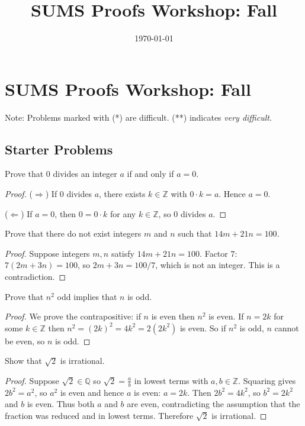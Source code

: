 \documentclass[12pt]{article}
\title{SUMS Proofs Workshop: Fall}
\author{}
\date{\today}
\begin{document}
\section*{SUMS Proofs Workshop: Fall}

Note: Problems marked with (*) are difficult. (**) indicates \emph{very difficult}.

\subsection*{Starter Problems}

\begin{problem}
Prove that $0$ divides an integer $a$ if and only if $a=0$.

\begin{proof}
($\Rightarrow$) If $0$ divides $a$, there exists $k\in\mathbb{Z}$ with $0\cdot k=a$. Hence $a=0$.

($\Leftarrow$) If $a=0$, then $0 = 0\cdot k$ for any $k\in\mathbb{Z}$, so $0$ divides $a$.
\end{proof}
\end{problem}

\begin{problem}
Prove that there do not exist integers $m$ and $n$ such that $14m+21n=100$.

\begin{proof}
Suppose integers $m,n$ satisfy $14m+21n=100$. Factor $7$: $7(2m+3n)=100$, so $2m+3n=100/7$, which is not an integer. This is a contradiction.
\end{proof}
\end{problem}

\begin{problem}
Prove that $n^2$ odd implies that $n$ is odd.

\begin{proof}
We prove the contrapositive: if $n$ is even then $n^2$ is even. If $n=2k$ for some $k\in\mathbb{Z}$ then $n^2=(2k)^2=4k^2=2(2k^2)$ is even. So if $n^2$ is odd, $n$ cannot be even, so $n$ is odd.
\end{proof}
\end{problem}

\begin{problem}
Show that $\sqrt{2}$ is irrational.

\begin{proof}
Suppose $\sqrt{2}\in\mathbb{Q}$ so $\sqrt{2}=\frac{a}{b}$ in lowest terms with $a,b\in\mathbb{Z}$. Squaring gives $2b^2=a^2$, so $a^2$ is even and hence $a$ is even: $a=2k$. Then $2b^2=4k^2$, so $b^2=2k^2$ and $b$ is even. Thus both $a$ and $b$ are even, contradicting the assumption that the fraction was reduced and in lowest terms. Therefore $\sqrt{2}$ is irrational.
\end{proof}
\end{problem}
\end{document}
